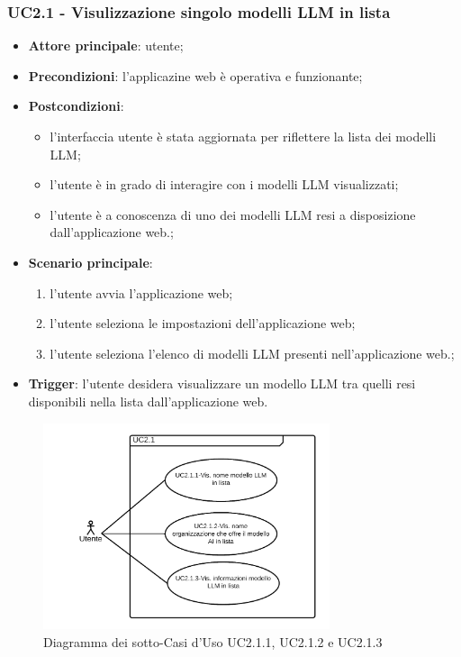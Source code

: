 \documentclass[10pt, a4paper]{article}
\begin{document}
    \subsubsection{UC2.1 - Visulizzazione singolo modelli LLM in lista}
    \begin{itemize}
        \item \textbf{Attore principale}: utente;
        \item \textbf{Precondizioni}: l'applicazine web è operativa e funzionante;
        \item \textbf{Postcondizioni}: 
        \begin{itemize}
            \item l'interfaccia utente è stata aggiornata per riflettere la lista dei modelli LLM;
            \item l'utente è in grado di interagire con i modelli LLM visualizzati;
            \item l'utente è a conoscenza di uno dei modelli LLM resi a disposizione dall'applicazione web.;
        \end{itemize} 
        \item \textbf{Scenario principale}:
            \begin{enumerate}
                \item l'utente avvia l'applicazione web;
                \item l'utente seleziona le impostazioni dell'applicazione web;
                \item l'utente seleziona l'elenco di modelli LLM presenti nell'applicazione web.;
            \end{enumerate}
        \item \textbf{Trigger}: l'utente desidera visualizzare un modello LLM tra quelli resi disponibili nella lista dall'applicazione web.
    \end{itemize}

    \begin{figure}[h]
        \centering
        \includegraphics[width=0.75\textwidth, height=0.75\textheight, keepaspectratio]{UC-images/UC2.1.1-UC2.1.2-UC2.1.3.png}
        \caption{Diagramma dei sotto-Casi d'Uso UC2.1.1, UC2.1.2 e UC2.1.3}
    \end{figure}
        
\end{document}
